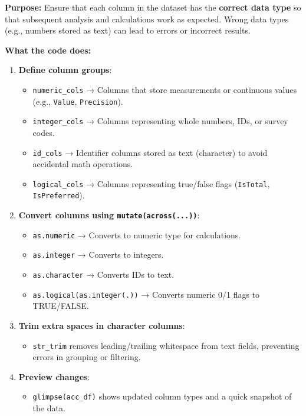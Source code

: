 \documentclass[
]{article}
\providecommand{\tightlist}{%
  \setlength{\itemsep}{0pt}\setlength{\parskip}{0pt}}
\begin{document}
\textbf{Purpose:} Ensure that each column in the dataset has the
\textbf{correct data type} so that subsequent analysis and calculations
work as expected. Wrong data types (e.g., numbers stored as text) can
lead to errors or incorrect results.

\textbf{What the code does:}

\begin{enumerate}
\def\labelenumi{\arabic{enumi}.}
\item
  \textbf{Define column groups}:

  \begin{itemize}
  \tightlist
  \item
    \texttt{numeric\_cols} → Columns that store measurements or
    continuous values (e.g., \texttt{Value}, \texttt{Precision}).
  \item
    \texttt{integer\_cols} → Columns representing whole numbers, IDs, or
    survey codes.
  \item
    \texttt{id\_cols} → Identifier columns stored as text (character) to
    avoid accidental math operations.
  \item
    \texttt{logical\_cols} → Columns representing true/false flags
    (\texttt{IsTotal}, \texttt{IsPreferred}).
  \end{itemize}
\item
  \textbf{Convert columns using \texttt{mutate(across(...))}}:

  \begin{itemize}
  \tightlist
  \item
    \texttt{as.numeric} → Converts to numeric type for calculations.
  \item
    \texttt{as.integer} → Converts to integers.
  \item
    \texttt{as.character} → Converts IDs to text.
  \item
    \texttt{as.logical(as.integer(.))} → Converts numeric 0/1 flags to
    TRUE/FALSE.
  \end{itemize}
\item
  \textbf{Trim extra spaces in character columns}:

  \begin{itemize}
  \tightlist
  \item
    \texttt{str\_trim} removes leading/trailing whitespace from text
    fields, preventing errors in grouping or filtering.
  \end{itemize}
\item
  \textbf{Preview changes}:

  \begin{itemize}
  \tightlist
  \item
    \texttt{glimpse(acc\_df)} shows updated column types and a quick
    snapshot of the data.
  \end{itemize}
\end{enumerate}
\end{document}
